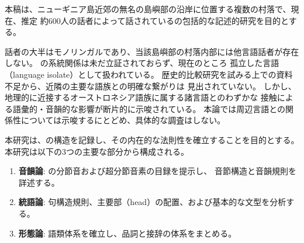 \label{sec:introduction}

本稿は、ニューギニア島近郊の無名の島嶼部の沿岸に位置する複数の村落で、現在、推定
約600人の話者によって話されている\langname の包括的な記述的研究を目的とする。

\langname 話者の大半はモノリンガルであり、当該島嶼部の村落内部には他言語話者が存在しない。
\langname の系統関係は未だ立証されておらず、現在のところ
孤立した言語（language isolate）として扱われている。
歴史的比較研究を試みる上での資料不足から、近隣の主要な語族との明確な繋がりは
見出されていない。
しかし、地理的に近接するオーストロネシア語族に属する諸言語とのわずかな
接触による語彙的・音韻的な影響が断片的に示唆されている。
本論では周辺言語との関係性については示唆するにとどめ、具体的な調査はしない。

本研究は、\langname の構造を記録し、その内在的な法則性を確立することを目的とする。
本研究は以下の3つの主要な部分から構成される。

\begin{enumerate}
    \item \textbf{音韻論}: \langname の分節音および超分節音素の目録を提示し、
    音節構造と音韻規則を詳述する。
    \item \textbf{統語論}: 句構造規則、主要部（head）の配置、および基本的な文型を分析する。
    \item \textbf{形態論}: 語類体系を確立し、品詞と接辞の体系をまとめる。
\end{enumerate}